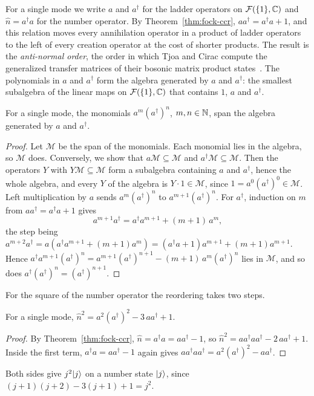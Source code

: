 \begin{vetyenv}
For a single mode we write $a$ and $a^\dagger$ for the ladder operators on $\mathcal F(\{1\},\mathbb C)$ and $\hat n=a^\dagger a$
for the number operator. By Theorem~\ref{thm:fock-ccr}, $aa^\dagger=a^\dagger a+1$, and this relation moves every
annihilation operator in a product of ladder operators to the left of every creation operator at the cost of shorter
products. The result is the \emph{anti-normal order}, the order in which Tjoa and Cirac compute the generalized transfer
matrices of their bosonic matrix product states~\cite[Prop.~2]{tjoacirac}. The polynomials in $a$ and $a^\dagger$ form the algebra generated by $a$ and $a^\dagger$: the
smallest subalgebra of the linear maps on $\mathcal F(\{1\},\mathbb C)$ that contains $1$, $a$ and $a^\dagger$.

\begin{theorem}\label{thm:fock-antinormal}
For a single mode, the monomials $a^m(a^\dagger)^n$, $m,n\in\mathbb N$, span the algebra generated by $a$ and $a^\dagger$.
\end{theorem}

\begin{proof}
Let $\mathcal M$ be the span of the monomials. Each monomial lies in the algebra, so $\mathcal M$ does. Conversely, we
show that $a\mathcal M\subseteq\mathcal M$ and $a^\dagger\mathcal M\subseteq\mathcal M$. Then the operators $Y$ with
$Y\mathcal M\subseteq\mathcal M$ form a subalgebra containing $a$ and $a^\dagger$, hence the whole algebra, and every $Y$ of
the algebra is $Y\cdot1\in\mathcal M$, since $1=a^0(a^\dagger)^0\in\mathcal M$. Left multiplication by $a$ sends
$a^m(a^\dagger)^n$ to $a^{m+1}(a^\dagger)^n$. For $a^\dagger$, induction on $m$ from $aa^\dagger=a^\dagger a+1$ gives
\[
 a^{m+1}a^\dagger=a^\dagger a^{m+1}+(m+1)\,a^m,
\]
the step being $a^{m+2}a^\dagger=a(a^\dagger a^{m+1}+(m+1)a^m)=(a^\dagger a+1)a^{m+1}+(m+1)a^{m+1}$. Hence
$a^\dagger a^{m+1}(a^\dagger)^n=a^{m+1}(a^\dagger)^{n+1}-(m+1)\,a^m(a^\dagger)^n$ lies in $\mathcal M$, and so does
$a^\dagger(a^\dagger)^n=(a^\dagger)^{n+1}$.
\end{proof}

For the square of the number operator the reordering takes two steps.

\begin{proposition}\label{prop:fock-number-sq}
For a single mode, $\hat n^2=a^2(a^\dagger)^2-3\,aa^\dagger+1$.
\end{proposition}

\begin{proof}
By Theorem~\ref{thm:fock-ccr}, $\hat n=a^\dagger a=aa^\dagger-1$, so $\hat n^2=aa^\dagger aa^\dagger-2\,aa^\dagger+1$. Inside
the first term, $a^\dagger a=aa^\dagger-1$ again gives $aa^\dagger aa^\dagger=a^2(a^\dagger)^2-aa^\dagger$.
\end{proof}

Both sides give $j^2\lvert j\rangle$ on a number state $\lvert j\rangle$, since $(j+1)(j+2)-3(j+1)+1=j^2$.
\end{vetyenv}

